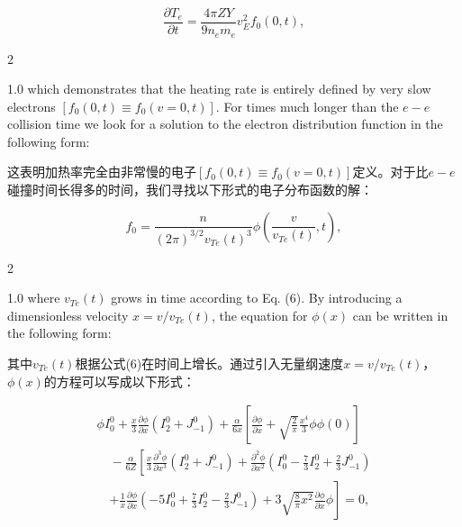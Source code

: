 \documentclass[oneside,onecolumn]{article}
\newcommand\enzhbox[2]{
	\quad\par \begin{paracol}{2} 
			\begin{spacing}{1.0}
					\footnotesize  #1
			\end{spacing}
			
		\switchcolumn[1] 
		#2
	\end{paracol} 
}
\begin{document}
\begin{sloppypar}
  \begin{equation}
  \frac{\partial T_{e}}{\partial t}=\frac{4 \pi Z Y}{9 n_{e} m_{e}} v_{E}^{2} f_{0}(0, t),
  \end{equation}
  

\enzhbox{  which demonstrates that the heating rate is entirely defined by very slow electrons $\left[f_{0}(0, t) \equiv f_{0}(v=0, t)\right]$. For times much longer than the $e-e$ collision time we look for a solution to the electron distribution function in the following form:
}{
这表明加热率完全由非常慢的电子$\left[f_{0}(0, t) \equiv f_{0}(v=0, t)\right]$定义。对于比$e-e$碰撞时间长得多的时间，我们寻找以下形式的电子分布函数的解：
}
  
  \begin{equation}
  f_{0}=\frac{n}{(2 \pi)^{3 / 2} v_{T e}(t)^{3}} \phi\left(\frac{v}{v_{T e}(t)}, t\right),
  \end{equation}
  

\enzhbox{  where $v_{T e}(t)$ grows in time according to Eq. (6). By introducing a dimensionless velocity $x=v / v_{T e}(t)$, the equation for $\phi(x)$ can be written in the following form:
}{
其中$v_{T e}(t)$根据公式(6)在时间上增长。通过引入无量纲速度$x=v / v_{T e}(t)$，$\phi(x)$的方程可以写成以下形式：
}
  

  \begin{equation}
  	\begin{gathered}
  		\phi I_{0}^{0}  +\frac{x}{3} \frac{\partial \phi}{\partial x}\left(I_{2}^{0}+J_{-1}^{0}\right)+\frac{\alpha}{6 x}\left[\frac{\partial \phi}{\partial x}+\sqrt{\frac{2}{\pi}} \frac{x^{4}}{3} \phi \phi(0)\right]\\\quad
  -\frac{\alpha}{6 Z}\left[\frac{x}{3} \frac{\partial^{3} \phi}{\partial x^{3}}\left(I_{2}^{0}+J_{-1}^{0}\right)+\frac{\partial^{2} \phi}{\partial x^{2}}\left(I_{0}^{0}-\frac{7}{3} I_{2}^{0}+\frac{2}{3} J_{-1}^{0}\right)\right.\\\quad
  \left.+\frac{1}{x} \frac{\partial \phi}{\partial x}\left(-5 I_{0}^{0}+\frac{7}{3} I_{2}^{0}-\frac{2}{3} J_{-1}^{0}\right)+3 \sqrt{\frac{8}{\pi} x^{2}} \frac{\partial \phi}{\partial x} \phi\right]=0,
  	\end{gathered}
  \end{equation}

  


\end{sloppypar}
\end{document}
